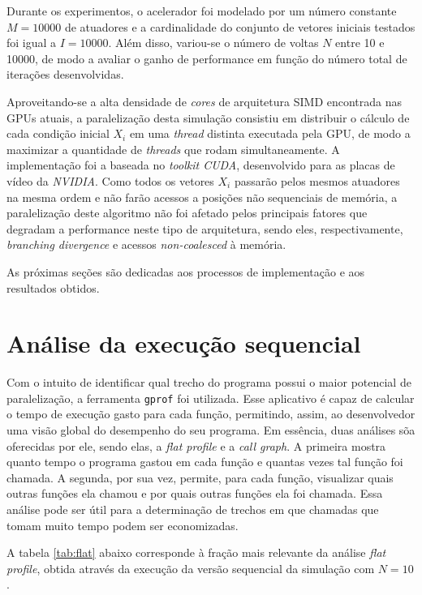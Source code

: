 \documentclass[12pt]{article}
\begin{document}
Durante os experimentos, o acelerador foi modelado por um número
constante \(M = 10000\) de atuadores e a cardinalidade do conjunto de vetores
iniciais testados foi igual a \(I = 10000\). Além disso, variou-se o número de
voltas \(N\) entre 10 e 10000, de modo a avaliar o ganho de performance em
função do número total de iterações desenvolvidas.

Aproveitando-se a alta densidade de \textit{cores} de arquitetura SIMD
encontrada nas GPUs atuais, a paralelização desta simulação consistiu em
distribuir o cálculo de cada condição inicial \(X_i\) em uma \textit{thread}
distinta executada pela GPU, de modo a maximizar a quantidade de
\textit{threads} que rodam simultaneamente. A implementação foi a baseada no
\textit{toolkit CUDA}, desenvolvido para as placas de vídeo da \textit{NVIDIA}.
Como todos os vetores \(X_i\) passarão pelos mesmos atuadores na mesma ordem e
não farão acessos a posições não sequenciais de memória, a paralelização deste
algoritmo não foi afetado pelos principais fatores que degradam a performance
neste tipo de arquitetura, sendo eles, respectivamente, \textit{branching
divergence} e acessos \textit{non-coalesced} à memória.

As próximas seções são dedicadas aos processos de implementação e aos resultados
obtidos.

\section {Análise da execução sequencial}

Com o intuito de identificar qual trecho do programa possui o maior potencial de
paralelização, a ferramenta \texttt{gprof} foi utilizada. Esse aplicativo é
capaz de calcular o tempo de execução gasto para cada função, permitindo, assim,
ao desenvolvedor uma visão global do desempenho do seu programa. Em
essência, duas análises sõa oferecidas por ele, sendo elas, a \textit {flat
profile} e a \textit{call graph}. A primeira mostra quanto tempo o programa
gastou em cada função e quantas vezes tal função foi chamada. A segunda, por sua
vez, permite, para cada função, visualizar quais outras funções ela chamou
e por quais outras funções ela foi chamada. Essa análise pode ser útil para a
determinação de trechos em que chamadas que tomam muito tempo podem ser
economizadas.

A tabela \ref{tab:flat} abaixo corresponde à fração mais relevante da análise
\textit{flat profile}, obtida através da execução da versão sequencial da
simulação com \(N = 10\). 
\end{document}
